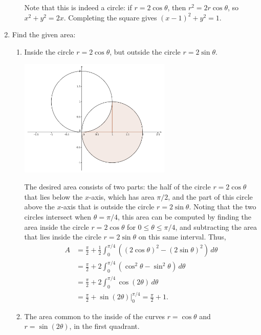 \documentclass[12pt]{article}
\begin{document}
\begin{enumerate}
\begin{enumerate}
Note that this is indeed a circle: if $r=2\cos\theta$, then $r^2=2r\cos\theta$, so $x^2+y^2=2x$. Completing the square gives $(x-1)^2+y^2=1$.
\end{enumerate}
\newpage

\item Find the given area:
\begin{enumerate}
\item Inside the circle $r=2\cos\theta$, but outside the circle $r=2\sin\theta$.

\begin{center}
 \includegraphics[width=0.6\textwidth]{WS6-4c}
\end{center}

The desired area consists of two parts: the half of the circle $r=2\cos\theta$ that lies below the $x$-axis, which has area $\pi/2$, and the part of this circle above the $x$-axis that is outside the circle $r=2\sin\theta$. Noting that the two circles intersect when $\theta=\pi/4$, this area can be computed by finding the area inside the circle $r=2\cos\theta$ for $0\leq \theta\leq \pi/4$, and subtracting the area that lies inside the circle $r=2\sin\theta$ on this same interval. Thus,
\begin{align*}
 A & = \frac{\pi}{2} + \frac{1}{2}\int_0^{\pi/4}((2\cos\theta)^2-(2\sin\theta)^2)\,d\theta\\
& = \frac{\pi}{2} + 2\int_0^{\pi/4}(\cos^2\theta-\sin^2\theta)\,d\theta\\
& = \frac{\pi}{2} + 2\int_0^{\pi/4}\cos(2\theta)\,d\theta\\
& = \frac{\pi}{2} + \sin(2\theta)\vert_0^{\pi/4} = \frac{\pi}{2}+1.
\end{align*}
\newpage

\item The area common to the inside of the curves $r=\cos\theta$ and $r=\sin(2\theta)$, in the first quadrant.


\end{enumerate}
\end{enumerate}
\end{document}
